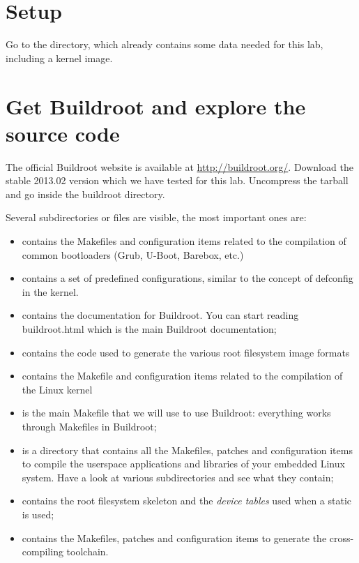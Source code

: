 
\section{Setup}

Go to the  directory,
which already contains some data needed for this lab, including a
kernel image.

\section{Get Buildroot and explore the source code}

The official Buildroot website is available at
\url{http://buildroot.org/}. Download the stable 2013.02 version which
we have tested for this lab. Uncompress the tarball and go inside the
buildroot directory.

Several subdirectories or files are visible, the most important ones
are:

\begin{itemize}
\item {} contains the Makefiles and configuration items
  related to the compilation of common bootloaders (Grub, U-Boot,
  Barebox, etc.)
\item {} contains a set of predefined configurations,
  similar to the concept of defconfig in the kernel.
\item {} contains the documentation for Buildroot. You can
  start reading buildroot.html which is the main Buildroot
  documentation;
\item {} contains the code used to generate the various root
  filesystem image formats
\item {} contains the Makefile and configuration items
  related to the compilation of the Linux kernel
\item {} is the main Makefile that we will use to use
  Buildroot: everything works through Makefiles in Buildroot;
\item {} is a directory that contains all the Makefiles,
  patches and configuration items to compile the userspace
  applications and libraries of your embedded Linux system. Have a
  look at various subdirectories and see what they contain;
\item {} contains the root filesystem skeleton and the {\em
    device tables} used when a static  is used;
\item {} contains the Makefiles, patches and
  configuration items to generate the cross-compiling toolchain.
\end{itemize}

